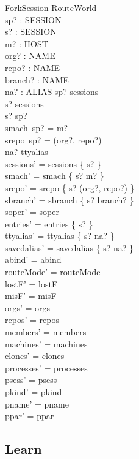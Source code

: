 \documentclass[a4paper,10pt,fleqn]{article}
\begin{document}
\begin{schema}{ForkSession}
  \Delta RouteWorld \\
  sp? : SESSION \\
  s? : SESSION \\
  m? : HOST \\
  org? : NAME \\
  repo? : NAME \\
  branch? : NAME \\
  na? : ALIAS
  \where
  sp? \in sessions \\
  s? \notin sessions \\
  s? \neq sp? \\
  smach~sp? = m? \\
  srepo~sp? = (org?, repo?) \\
  na? \notin \ran ttyalias \\
  sessions' = sessions \cup \{ s? \} \\
  smach' = smach \cup \{ s? \mapsto m? \} \\
  srepo' = srepo \cup \{ s? \mapsto (org?, repo?) \} \\
  sbranch' = sbranch \cup \{ s? \mapsto branch? \} \\
  soper' = soper \\
  entries' = entries \cup \{ s? \} \\
  ttyalias' = ttyalias \cup \{ s? \mapsto na? \} \\
  savedalias' = savedalias \oplus \{ s? \mapsto na? \} \\
  abind' = abind \\
  routeMode' = routeMode \\
  lostF' = lostF \\
  misF' = misF \\
  orgs' = orgs \\
  repos' = repos \\
  members' = members \\
  machines' = machines \\
  clones' = clones \\
  processes' = processes \\
  psess' = psess \\
  pkind' = pkind \\
  pname' = pname \\
  ppar' = ppar
\end{schema}

\subsection{Learn}
\end{document}
